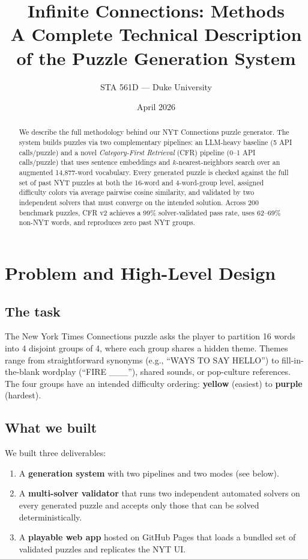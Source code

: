 \documentclass[11pt, letterpaper]{article}
\title{\textbf{Infinite Connections: Methods}\\[0.3em]
\large A Complete Technical Description of the Puzzle Generation System}
\author{STA 561D --- Duke University}
\date{April 2026}
\begin{document}
\maketitle
\thispagestyle{fancy}
\vspace{-1.5em}

\begin{abstract}
\noindent
We describe the full methodology behind our NYT Connections puzzle generator.
The system builds puzzles via two complementary pipelines: an LLM-heavy baseline
(5 API calls/puzzle) and a novel \emph{Category-First Retrieval} (CFR) pipeline
(0--1 API calls/puzzle) that uses sentence embeddings and $k$-nearest-neighbors
search over an augmented 14{,}877-word vocabulary. Every generated puzzle is
checked against the full set of past NYT puzzles at both the 16-word and 4-word-group
level, assigned difficulty colors via average pairwise cosine similarity, and validated
by two independent solvers that must converge on the intended solution. Across 200
benchmark puzzles, CFR v2 achieves a 99\% solver-validated pass rate, uses 62--69\%
non-NYT words, and reproduces zero past NYT groups.
\end{abstract}

\tableofcontents
\vspace{1em}

\section{Problem and High-Level Design}

\subsection{The task}
The New York Times Connections puzzle asks the player to partition 16 words into
4 disjoint groups of 4, where each group shares a hidden theme. Themes range from
straightforward synonyms (e.g., ``WAYS TO SAY HELLO'') to fill-in-the-blank
wordplay (``FIRE \_\_\_''), shared sounds, or pop-culture references. The four
groups have an intended difficulty ordering: \textcolor{yellow_conn!80!black}{\textbf{yellow}}
(easiest) to \textcolor{purple_conn!70!black}{\textbf{purple}} (hardest).

\subsection{What we built}
We built three deliverables:
\begin{enumerate}[leftmargin=*, itemsep=0.15em]
\item A \textbf{generation system} with two pipelines and two modes (see below).
\item A \textbf{multi-solver validator} that runs two independent automated solvers on
every generated puzzle and accepts only those that can be solved deterministically.
\item A \textbf{playable web app} hosted on GitHub Pages that loads a bundled set of
validated puzzles and replicates the NYT UI.
\end{enumerate}
\end{document}

